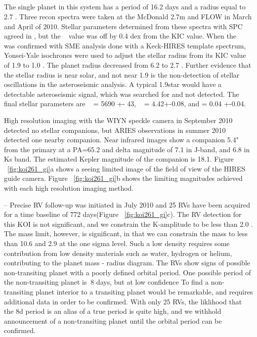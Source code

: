 \documentclass{emulateapj}
\begin{document}


\subsection{\koitwosixone}  %

The single planet in this system has a period of 16.2 days and a radius equal to 2.7 \rearthe.  Three recon spectra were taken at the McDonald 2.7m and FLOW in March and April of 2010. Stellar parameters determined from these spectra with SPC agreed in \teff, but the \logg~ value was off by 0.4 dex from the KIC value. When the \logg~ was confirmed with SME analysis done with a Keck-HIRES template spectrum, Yonsei-Yale isochrones were used to adjust the stellar radius  from its KIC value of 1.9 to 1.0 \rsun. The planet  radius decreased from 6.2 to 2.7 \rearthe. Further evidence that the stellar radius is near solar, and not near 1.9 \rsun is the non-detection of stellar oscillations in the asteroseismic analysis. A typical 1.9\rsun star would have a detectable asteroseismic signal, which was searched for and not detected. The final stellar parameters are \teff~ = 5690 +- 43, \logg~ = 4.42+-0.08, and \feh = 0.04 +-0.04.

High resolution imaging with the WIYN speckle camera in September 2010 detected no stellar companions, but ARIES observations in summer 2010 detected one nearby companion. Near infrared images show a companion 5.4" from the primary at a PA=65.2 and delta magnitude of 7.1 in J-band, and 6.8 in Ks band. The estimated Kepler magnitude of the companion is 18.1. Figure ~\ref{fig:koi261_gi}a shows a seeing limited  image of the field of view of the HIRES guide camera. Figure ~\ref{fig:koi261_gi}b shows the limiting magnitudes achieved with each high resolution imaging method. 

--
Precise RV follow-up was initiated in July 2010 and  25 RVs have been acquired for a time baseline of 772 days(Figure ~\ref{fig:koi261_gi}c). The RV detection for this KOI is not significant, and we constrain the K-amplitude to be less than 2.0 \ms. The mass limit, however, is significant, in that we can constrain the mass to less than 10.6 \mearth and 2.9 \gcc at the one sigma level. Such a low density requires some contribution from low density materials such as water, hydrogen or helium, contributing to the planet mass - radius diagram. The RVs show signs of possible non-transiting planet with a poorly defined orbital period.  One possible period of the non-transiting planet is $~$8 days, but at low confidence To find a non-transiting planet interior to a transiting planet would be remarkable, and requires additional data in order to be confirmed. With only 25 RVs, the liklihood that the 8d period is an alias of a true period is quite high, and we withhold announcement of a non-transiting planet until the orbital period can be confirmed.
\end{document}

